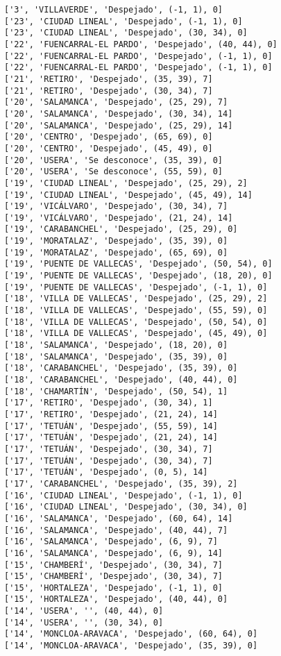 \documentclass[11pt]{article}
\begin{document}
\begin{Verbatim}[commandchars=\\\{\}]
['3', 'VILLAVERDE', 'Despejado', (-1, 1), 0]
['23', 'CIUDAD LINEAL', 'Despejado', (-1, 1), 0]
['23', 'CIUDAD LINEAL', 'Despejado', (30, 34), 0]
['22', 'FUENCARRAL-EL PARDO', 'Despejado', (40, 44), 0]
['22', 'FUENCARRAL-EL PARDO', 'Despejado', (-1, 1), 0]
['22', 'FUENCARRAL-EL PARDO', 'Despejado', (-1, 1), 0]
['21', 'RETIRO', 'Despejado', (35, 39), 7]
['21', 'RETIRO', 'Despejado', (30, 34), 7]
['20', 'SALAMANCA', 'Despejado', (25, 29), 7]
['20', 'SALAMANCA', 'Despejado', (30, 34), 14]
['20', 'SALAMANCA', 'Despejado', (25, 29), 14]
['20', 'CENTRO', 'Despejado', (65, 69), 0]
['20', 'CENTRO', 'Despejado', (45, 49), 0]
['20', 'USERA', 'Se desconoce', (35, 39), 0]
['20', 'USERA', 'Se desconoce', (55, 59), 0]
['19', 'CIUDAD LINEAL', 'Despejado', (25, 29), 2]
['19', 'CIUDAD LINEAL', 'Despejado', (45, 49), 14]
['19', 'VICÁLVARO', 'Despejado', (30, 34), 7]
['19', 'VICÁLVARO', 'Despejado', (21, 24), 14]
['19', 'CARABANCHEL', 'Despejado', (25, 29), 0]
['19', 'MORATALAZ', 'Despejado', (35, 39), 0]
['19', 'MORATALAZ', 'Despejado', (65, 69), 0]
['19', 'PUENTE DE VALLECAS', 'Despejado', (50, 54), 0]
['19', 'PUENTE DE VALLECAS', 'Despejado', (18, 20), 0]
['19', 'PUENTE DE VALLECAS', 'Despejado', (-1, 1), 0]
['18', 'VILLA DE VALLECAS', 'Despejado', (25, 29), 2]
['18', 'VILLA DE VALLECAS', 'Despejado', (55, 59), 0]
['18', 'VILLA DE VALLECAS', 'Despejado', (50, 54), 0]
['18', 'VILLA DE VALLECAS', 'Despejado', (45, 49), 0]
['18', 'SALAMANCA', 'Despejado', (18, 20), 0]
['18', 'SALAMANCA', 'Despejado', (35, 39), 0]
['18', 'CARABANCHEL', 'Despejado', (35, 39), 0]
['18', 'CARABANCHEL', 'Despejado', (40, 44), 0]
['18', 'CHAMARTÍN', 'Despejado', (50, 54), 1]
['17', 'RETIRO', 'Despejado', (30, 34), 1]
['17', 'RETIRO', 'Despejado', (21, 24), 14]
['17', 'TETUÁN', 'Despejado', (55, 59), 14]
['17', 'TETUÁN', 'Despejado', (21, 24), 14]
['17', 'TETUÁN', 'Despejado', (30, 34), 7]
['17', 'TETUÁN', 'Despejado', (30, 34), 7]
['17', 'TETUÁN', 'Despejado', (0, 5), 14]
['17', 'CARABANCHEL', 'Despejado', (35, 39), 2]
['16', 'CIUDAD LINEAL', 'Despejado', (-1, 1), 0]
['16', 'CIUDAD LINEAL', 'Despejado', (30, 34), 0]
['16', 'SALAMANCA', 'Despejado', (60, 64), 14]
['16', 'SALAMANCA', 'Despejado', (40, 44), 7]
['16', 'SALAMANCA', 'Despejado', (6, 9), 7]
['16', 'SALAMANCA', 'Despejado', (6, 9), 14]
['15', 'CHAMBERÍ', 'Despejado', (30, 34), 7]
['15', 'CHAMBERÍ', 'Despejado', (30, 34), 7]
['15', 'HORTALEZA', 'Despejado', (-1, 1), 0]
['15', 'HORTALEZA', 'Despejado', (40, 44), 0]
['14', 'USERA', '', (40, 44), 0]
['14', 'USERA', '', (30, 34), 0]
['14', 'MONCLOA-ARAVACA', 'Despejado', (60, 64), 0]
['14', 'MONCLOA-ARAVACA', 'Despejado', (35, 39), 0]

\end{Verbatim}
\end{document}
